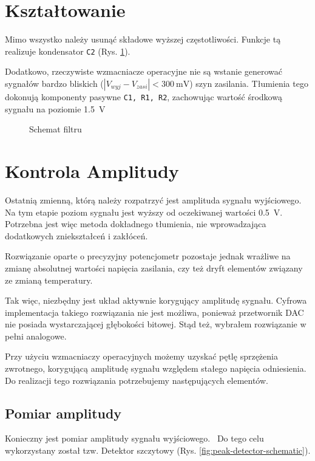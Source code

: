 \documentclass[12pt, a4paper]{article}
\begin{document}
\section{Kształtowanie}
Mimo wszystko należy usunąć składowe wyższej częstotliwości. Funkcje tą realizuje kondensator \verb|C2| (Rys. \ref{fig:filter}).

Dodatkowo, rzeczywiste wzmacniacze operacyjne nie są wstanie generować sygnałów bardzo bliskich ($ |V_{wyj} - V_{zasi}| <\qty{300}{\mV}$) szyn zasilania.
Tłumienia tego dokonują komponenty pasywne \verb|C1, R1, R2|, zachowując wartość środkową sygnału na poziomie \qty{1,5}{\V}

\begin{figure}[h]
	\centering
	
	\caption{Schemat filtru}
	\label{fig:filter}
\end{figure}

\section{Kontrola Amplitudy}

Ostatnią zmienną, którą należy rozpatrzyć jest amplituda sygnału wyjściowego. Na tym etapie poziom sygnału jest wyższy od oczekiwanej wartości
\qty{0,5}{\V}. Potrzebna jest więc metoda dokładnego tłumienia, nie wprowadzająca dodatkowych zniekształceń i zakłóceń.

Rozwiązanie oparte o precyzyjny potencjometr pozostaje jednak wrażliwe na zmianę absolutnej wartości napięcia zasilania,
czy też dryft elementów związany ze zmianą temperatury.

Tak więc, niezbędny jest układ aktywnie korygujący amplitudę sygnału.
Cyfrowa implementacja takiego rozwiązania nie jest możliwa, 
ponieważ przetwornik DAC nie posiada wystarczającej głębokości bitowej. 
Stąd też, wybrałem rozwiązanie w pełni analogowe.

Przy użyciu wzmacniaczy operacyjnych możemy uzyskać pętlę sprzężenia zwrotnego, 
korygującą amplitudę sygnału względem stałego napięcia odniesienia.
Do realizacji tego rozwiązania potrzebujemy następujących elementów.

\subsection{Pomiar amplitudy}
Konieczny jest pomiar amplitudy sygnału wyjściowego. \
Do tego celu wykorzystany został tzw. Detektor szczytowy (Rys. \ref{fig:peak-detector-schematic}). 
\end{document}
